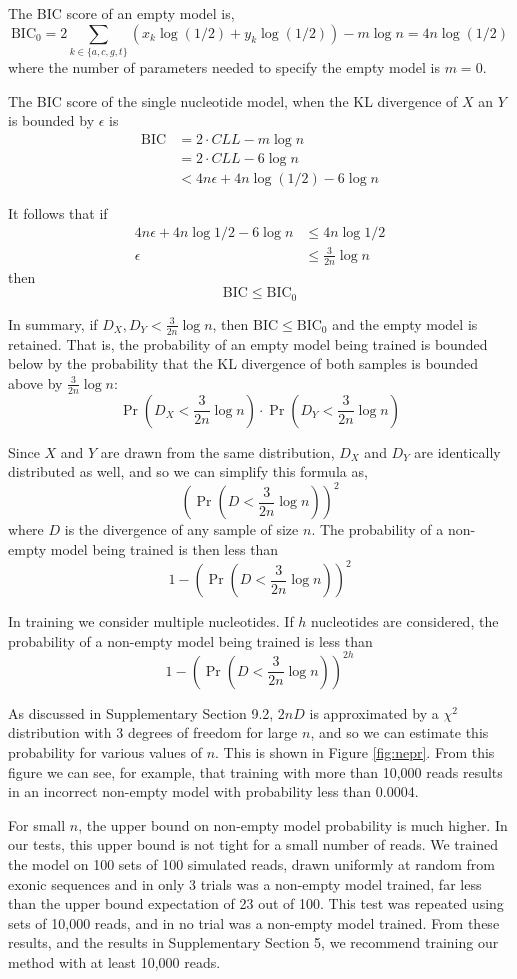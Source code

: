 \documentclass[letterpaper]{article}
\begin{document}
The BIC score of an empty model is,
$$\text{BIC}_0 = 2 \sum_{k \in \{a, c, g, t\}}
\left(
x_k \log(1/2) + y_k \log(1/2) \right) - m
\log n = 4 n \log (1/2) $$
where the number of parameters needed to specify the empty model is $m = 0$.

The BIC score of the single nucleotide model, when the KL divergence of $X$ an
$Y$ is bounded by $\epsilon$ is
\begin{align*}
\text{BIC} &= 2 \cdot CLL - m \log n \\
&= 2 \cdot CLL - 6 \log n \\
&< 4n \epsilon + 4 n \log (1/2) - 6 \log n
\end{align*}

It follows that if
\begin{align*}
4n \epsilon + 4 n \log 1 / 2 - 6 \log n  &\le   4 n \log 1/2 \\
\epsilon &\le \frac{3}{2n} \log n
\end{align*}
then
$$ \text{BIC} \le \text{BIC}_0 $$

In summary, if $D_X, D_Y < \frac{3}{2n} \log n$, then $\text{BIC} \le
\text{BIC}_0$ and the empty model is retained. That is, the probability of an
empty model being trained is bounded below by the probability that the KL
divergence of both samples is bounded above by $\frac{3}{2n} \log n$:
$$ \Pr(D_{X} < \frac{3}{2n} \log n) \cdot 
\Pr(D_{Y} < \frac{3}{2n} \log n) $$

Since $X$ and $Y$ are drawn from the same distribution, $D_{X}$ and $D_{Y}$ are
identically distributed as well, and so we can simplify this formula as,
$$ (\Pr(D < \frac{3}{2n} \log n))^2 $$
where $D$ is the divergence of any sample of size $n$. The probability of a
non-empty model being trained is then less than
$$ 1 - (\Pr(D < \frac{3}{2n} \log n))^2 $$

In training we consider multiple nucleotides. If $h$ nucleotides are considered,
the probability of a non-empty model being trained is less than
$$ 1 - (\Pr(D < \frac{3}{2n} \log n))^{2h} $$

As discussed in Supplementary Section 9.2, $2n D$ is approximated by a $\chi^2$
distribution with 3 degrees of freedom for large $n$, and so we can estimate
this probability for various values of $n$. This is shown in Figure
\ref{fig:nepr}. From this figure we can see, for example, that training with
more than 10,000 reads results in an incorrect non-empty model with probability
less than 0.0004.

For small $n$, the upper bound on non-empty model probability is much higher.
In our tests, this upper bound is not tight for a small number of reads. We
trained the model on 100 sets of 100 simulated reads, drawn uniformly at random
from exonic sequences and in only 3 trials was a non-empty model trained, far
less than the upper bound expectation of 23 out of 100. This test was repeated
using sets of 10,000 reads, and in no trial was a non-empty model trained.  From
these results, and the results in Supplementary Section 5, we recommend training
our method with at least 10,000 reads.
\end{document}
